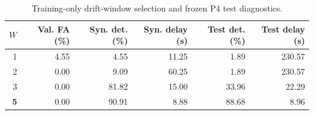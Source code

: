 
\begin{table}[t]
\caption{Training-only drift-window selection and frozen P4 test diagnostics.}
\label{tab:monitor-window}
\centering
\scriptsize
\setlength{\tabcolsep}{2.7pt}
\begin{tabular}{rrrrrr}
\toprule
$W$ & Val. FA (\%) & Syn. det. (\%) & Syn. delay (s) & Test det. (\%) & Test delay (s) \\
\midrule
1 & 4.55 & 4.55 & 11.25 & 1.89 & 230.57 \\
2 & 0.00 & 9.09 & 60.25 & 1.89 & 230.57 \\
3 & 0.00 & 81.82 & 15.00 & 33.96 & 22.29 \\
\textbf{5} & 0.00 & 90.91 & 8.88 & 88.68 & 8.96 \\
\bottomrule
\end{tabular}
\end{table}
